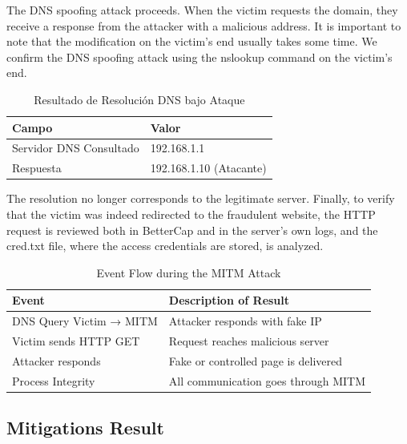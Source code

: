 \documentclass[conference]{IEEEtran}
\begin{document}
The DNS spoofing attack proceeds. When the victim requests the domain, they receive a response from the attacker with a malicious address. It is important to note that the modification on the victim's end usually takes some time. We confirm the DNS spoofing attack using the nslookup command on the victim's end.

\begin{table}[htbp]
\caption{Resultado de Resolución DNS bajo Ataque}
\label{tab:dnsresult}
\begin{center}
\begin{tabular}{@{}p{3cm} p{5.1cm}@{}} \hline
\textbf{Campo} & \textbf{Valor} \\ \hline
Servidor DNS Consultado & 192.168.1.1 \\ 
Respuesta & 192.168.1.10 (Atacante) \\ 
\hline
\end{tabular}
\end{center}
\end{table}
The resolution no longer corresponds to the legitimate server. Finally, to verify that the victim was indeed redirected to the fraudulent website, the HTTP request is reviewed both in BetterCap and in the server's own logs, and the cred.txt file, where the access credentials are stored, is analyzed.


\begin{table}[htbp]
\caption{Event Flow during the MITM Attack}
\label{tab:mitmflow}
\begin{center}
\begin{tabular}{@{}p{3.5cm} p{4.8cm}@{}} \hline
\textbf{Event} & \textbf{Description of Result} \\ \hline
DNS Query Victim → MITM & Attacker responds with fake IP \\ 
Victim sends HTTP GET & Request reaches malicious server \\ 
Attacker responds & Fake or controlled page is delivered \\ 
Process Integrity & All communication goes through MITM \\ 
\hline
\end{tabular}
\end{center}
\end{table}



\subsection{Mitigations Result}
\end{document}
